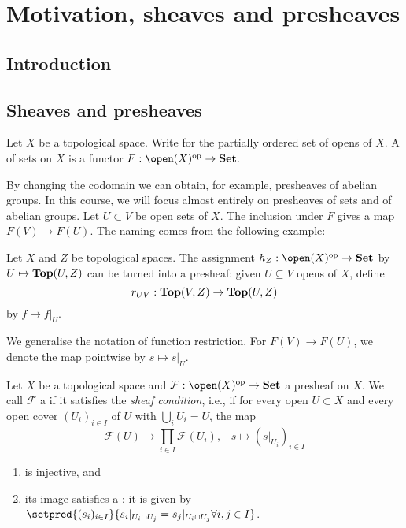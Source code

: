 \chapter{Motivation, sheaves and presheaves}

\section{Introduction}


\section{Sheaves and presheaves}

\begin{defn}
    Let $X$ be a topological space. Write  for the partially ordered set of opens of $X$.  A  of sets on $X$ is a functor
    $
        F: \open(X)\opp \to \catSet. 
    $
\end{defn}
By changing the codomain we can obtain, for example, presheaves of abelian groups. In this course, we will focus almost entirely on presheaves of sets and of abelian groups.
Let $U \subset V $ be open sets of $X$. The inclusion under $F$ gives a  map $F(V) \to F(U)$. The naming comes from the following example: 

\begin{exmp}\label{exmp:ct-maps-presheaf}
    Let $X$ and $Z$ be topological spaces. The assignment $h_Z: \open(X)\opp \to \catSet$ by $U \mapsto \cont(U,Z)$ can be turned into a presheaf: given $U \subseteq V$ opens of $X$, define $$r_{UV}: \cont(V,Z) \to \cont(U,Z)$$ by $f \mapsto f|_U$.
\end{exmp}
We generalise the notation of function restriction. For $F(V) \to F(U)$, we denote the map pointwise by $s \mapsto s|_U$.

\begin{defn}\label{defn:sheaf}
    Let $X$ be a topological space and $\mathcal{F}: \open(X)\opp \to \catSet$ a presheaf on $X$.  We call $\mathcal{F}$ a  if it satisfies the \emph{sheaf condition}, i.e., if
    for every open $U \subset X$ and every open cover $(U_i)_{i \in I}$ of $U$ with $\bigcup_i U_i = U$, the map 
        \[
            \mathcal{F}(U) \to \prod_{i\in I}\mathcal{F}(U_i)\text{,} \quad s \mapsto (s|_{U_i})_{i \in I}
          \]
    \begin{enumerate}
        \item\label{defn:sheaf:injective} is injective, and
        \item\label{defn:sheaf:gluing} its image satisfies a : it is given by $\setpred{(s_i)_{i\in I}}{s_i |_{U_i \cap U_j} = s_j | _ {U_i \cap U_j} \forall i,j \in I}$.
    \end{enumerate}
\end{defn}

